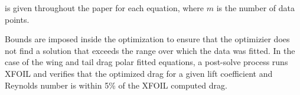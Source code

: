  is given throughout the paper for each equation, where $m$ is the number of data points. 

Bounds are imposed inside the optimization to ensure that the optimizier does not find a solution that exceeds the range over which the data was fitted.  In the case of the wing and tail drag polar fitted equations, a post-solve process runs XFOIL and verifies that the optimized drag for a given lift coefficient and Reynolds number is within 5\% of the XFOIL computed drag.

% 
% 
% 
